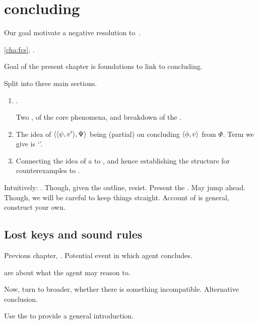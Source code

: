 \chapter{  concluding}
\label{cha:zS}

\begin{note}
  Our goal motivate a negative resolution to~\issueConstraint{}.

  \autoref{cha:fcs}, .

  Goal of the present chapter is foundations to link  to concluding.

  Split into three main sections.
  \begin{enumerate}[label=]
  \item
    .

    Two ,  of the core phenomena, and breakdown of the .
  \item

    The idea of \(\langle \langle \psi, v' \rangle, \Psi \rangle\) being (partial) \check{} on concluding \(\langle \phi, v \rangle\) from \(\Phi\).
    Term we give is `\curb{}'.
  \item

    Connecting the idea of a \curb{} to \ros{}, and hence establishing the structure for counterexamples to \issueConstraint{}.
  \end{enumerate}

  Intuitively: \qWhyV{}.
  Though, given the outline, resist.
  Present the .
  May jump ahead.
  Though, we will be careful to keep things straight.
  Account of  is general, construct your own.
\end{note}

\section{Lost keys and sound rules}
\label{cha:zS:sec:lost-keys}

\begin{note}
  Previous chapter, .
  Potential event in which agent concludes.

   are about what the agent may reason to.

  Now, turn to broader, whether there is something incompatible.
  Alternative conclusion.
\end{note}

\begin{note}
  Use the \illu{} to provide a general introduction.
\end{note}

